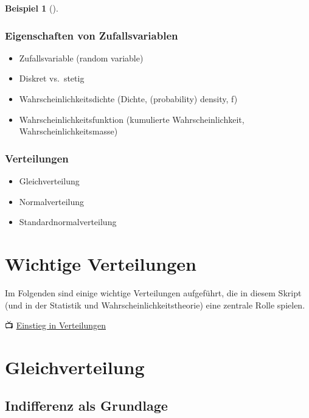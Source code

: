 \documentclass[
  ngerman,
  letterpaper,
  twoside,
  open=any]{scrbook}
\providecommand{\tightlist}{%
  \setlength{\itemsep}{0pt}\setlength{\parskip}{0pt}}\usepackage{longtable,booktabs,array}
\theoremstyle{definition}
\newtheorem{example}{Beispiel}[chapter]
\theoremstyle{plain}
\theoremstyle{definition}
\theoremstyle{definition}
\theoremstyle{remark}
\begin{document}
\begin{example}[]
\subsubsection{Eigenschaften von
Zufallsvariablen}\label{eigenschaften-von-zufallsvariablen}

\begin{itemize}
\tightlist
\item
  Zufallsvariable (random variable)
\item
  Diskret vs.~stetig
\item
  Wahrscheinlichkeitsdichte (Dichte, (probability) density, f)
\item
  Wahrscheinlichkeitsfunktion (kumulierte Wahrscheinlichkeit,
  Wahrscheinlichkeitsmasse)
\end{itemize}

\subsubsection{Verteilungen}\label{verteilungen-1}

\begin{itemize}
\tightlist
\item
  Gleichverteilung
\item
  Normalverteilung
\item
  Standardnormalverteilung
\end{itemize}

\section{Wichtige Verteilungen}\label{wichtige-verteilungen}

Im Folgenden sind einige wichtige Verteilungen aufgeführt, die in diesem
Skript (und in der Statistik und Wahrscheinlichkeitstheorie) eine
zentrale Rolle spielen.

📺
\href{https://www.youtube.com/watch?v=HKWwondYsW8&list=PLRR4REmBgpIGgz2Oe2Z9FcoLYBDnaWatN&index=5}{Einstieg
in Verteilungen}

\section{Gleichverteilung}\label{gleichverteilung}

\subsection{Indifferenz als Grundlage}\label{indifferenz-als-grundlage}


\end{example}
\end{document}
